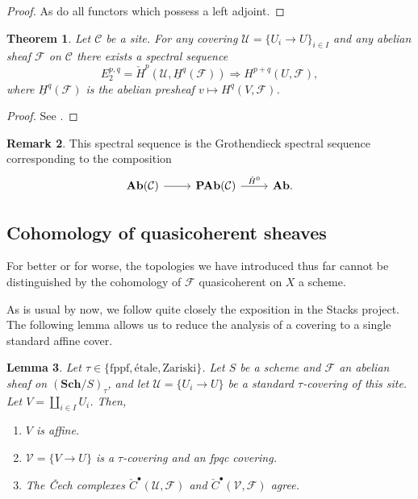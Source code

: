 \documentclass{amsart}
\newcommand{\Sch}{\mathbf{Sch}}
\newcommand{\Ab}{\mathbf{Ab}}
\newcommand{\PAb}{\mathbf{PAb}}
\newtheorem{theorem}{Theorem}[section]
\newtheorem{lemma}[theorem]{Lemma}
\theoremstyle{definition}
\newtheorem{remark}[theorem]{Remark}
\theoremstyle{remark}
\begin{document}
\begin{proof}
    As do all functors which possess a left adjoint.
\end{proof}

\begin{theorem}
    Let $\mathcal{C}$ be a site. For any covering $\mathcal{U} = \{U_i \to
    U\}_{i \in I}$ and any abelian sheaf $\mathcal{F}$ on $\mathcal{C}$ there
    exists a spectral sequence
    \[
        E_2^{p, q} = \check{H}^p(\mathcal{U}, \underline{H}^q(\mathcal{F}))
        \Rightarrow H^{p+q}(U, \mathcal{F}),
    \]
    where $\underline{H}^q(\mathcal{F})$ is the abelian presheaf $v \mapsto
    H^q(V, \mathcal{F})$.
\end{theorem}

\begin{proof}
    See \cite[\href{https://stacks.math.columbia.edu/tag/03OW}{Tag
        03OW}]{stacks-project}.
\end{proof}

\begin{remark}
    This spectral sequence is the Grothendieck spectral sequence corresponding
    to the composition
    \[
        \begin{tikzcd}
            \Ab(\mathcal{C}) \ar[r] &
            \PAb(\mathcal{C}) \ar[r, "\check{H}^0"] &
            \Ab.
        \end{tikzcd}
    \]
\end{remark}

\subsection{Cohomology of quasicoherent sheaves}

For better or for worse, the topologies we have introduced thus far cannot be
distinguished by the cohomology of $\mathcal{F}$ quasicoherent on $X$ a scheme.

As is usual by now, we follow quite closely the exposition in the Stacks
project. The following lemma allows us to reduce the analysis of a covering to a
single standard affine cover.

\begin{lemma}
    Let $\tau \in \{\text{fppf}, \text{\'etale}, \text{Zariski}\}$. Let $S$ be a
    scheme and $\mathcal{F}$ an abelian sheaf on $(\Sch/S)_\tau$, and let
    $\mathcal{U} = \{ U_i \to U\}$ be a standard $\tau$-covering of this site.
    Let $V = \coprod_{i \in I} U_i$. Then,
    \begin{enumerate}
        \item $V$ is affine.
        \item $\mathcal{V} = \{V \to U\}$ is a $\tau$-covering and an fpqc
            covering.
        \item The \v{C}ech complexes $\check{C}^{\bullet}(\mathcal{U},
            \mathcal{F})$ and $\check{C}^{\bullet}(\mathcal{V}, \mathcal{F})$
            agree.
    \end{enumerate}
\end{lemma}
\end{document}
